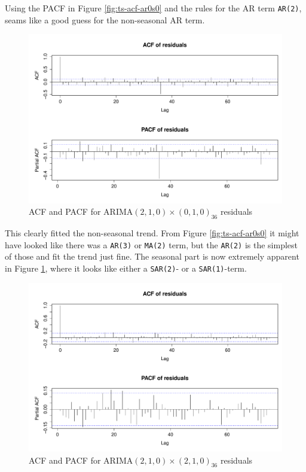 Using the PACF in Figure \ref{fig:ts-acf-ar0s0} and the rules for the AR term \cite[Table~6.1]{time-series-analysis} \texttt{AR(2)}, seams like a good guess for the non-seasonal AR term.
\begin{figure}[H]
	\centering
	\includegraphics[width=\textwidth]{figures/ts-acf-ar2s0}
	\caption{ACF and PACF for ARIMA$(2,1,0) \times (0,1,0)_{36}$ residuals}
	\label{fig:ts-acf-ar2s0}
\end{figure}

This clearly fitted the non-seasonal trend. From Figure \ref{fig:ts-acf-ar0s0} it might have looked like there was a \texttt{AR(3)} or \texttt{MA(2)} term, but the \texttt{AR(2)} is the simplest of those and fit the trend just fine. The seasonal part is now extremely apparent in Figure \ref{fig:ts-acf-ar2s0}, where it looks like either a \texttt{SAR(2)}- or a \texttt{SAR(1)}-term.
\begin{figure}[H]
	\centering
	\includegraphics[width=\textwidth]{figures/ts-acf-ar2s2}
	\caption{ACF and PACF for ARIMA$(2,1,0) \times (2,1,0)_{36}$ residuals}
	\label{fig:ts-acf-ar2s2}
\end{figure}

